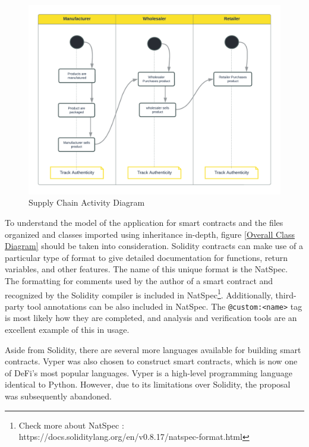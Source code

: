 \begin{figure}[h]
\centering
  \includegraphics[width=12cm]{includes/figures/Activity Diagram.png} 
  \caption{Supply Chain Activity Diagram}
  \label{Activity Diagram}
\end{figure}

\vspace{.5cm}

To understand the model of the application for smart contracts and the files organized and classes imported using inheritance in-depth, figure \ref{Overall Class Diagram} should be taken into consideration. Solidity contracts can make use of a particular type of format to give detailed documentation for functions, return variables, and other features. The name of this unique format is the \ac{NatSpec}. The formatting for comments used by the author of a smart contract and recognized by the Solidity compiler is included in \ac{NatSpec}\footnote{Check more about NatSpec : https://docs.soliditylang.org/en/v0.8.17/natspec-format.html}. Additionally, third-party tool annotations can be also included in \ac{NatSpec}. The \texttt{@custom:<name>} tag is most likely how they are completed, and analysis and verification tools are an excellent example of this in usage.

\vspace{.5cm}

Aside from Solidity, there are several more languages available for building smart contracts. Vyper was also chosen to construct smart contracts, which is now one of \ac{DeFi}'s most popular languages. Vyper is a high-level programming language identical to Python. However, due to its limitations over Solidity, the proposal was subsequently abandoned.

